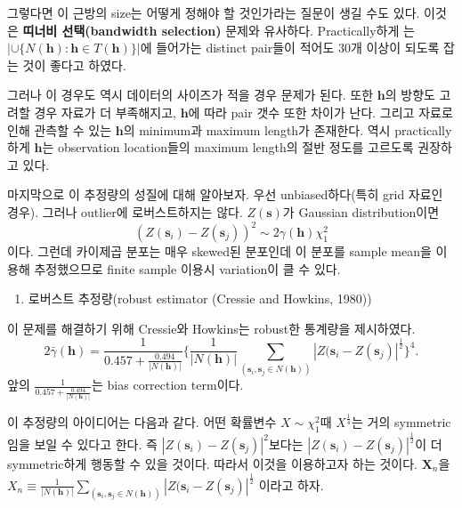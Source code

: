 \documentclass[b5paper,]{scrbook}
\providecommand{\tightlist}{%
  \setlength{\itemsep}{0pt}\setlength{\parskip}{0pt}}
\theoremstyle{plain}
\theoremstyle{definition}
\numberwithin{equation}{section}
\begin{document}
그렇다면 이 근방의 size는 어떻게 정해야 할 것인가라는 질문이 생길 수도 있다. 이것은 \textbf{띠너비 선택(bandwidth selection)} 문제와 유사하다. Practically하게 \citep{Journel2003}는 \(| \cup \{N(\mathbf{h}): \mathbf{h} \in T(\mathbf{h}) \} |\)에 들어가는 distinct pair들이 적어도 30개 이상이 되도록 잡는 것이 좋다고 하였다.

그러나 이 경우도 역시 데이터의 사이즈가 적을 경우 문제가 된다. 또한 \(\mathbf{h}\)의 방향도 고려할 경우 자료가 더 부족해지고, \(\mathbf{h}\)에 따라 pair 갯수 또한 차이가 난다. 그리고 자료로 인해 관측할 수 있는 \(\mathbf{h}\)의 minimum과 maximum length가 존재한다. 역시 practically하게 \(\mathbf{h}\)는 observation location들의 maximum length의 절반 정도를 고르도록 권장하고 있다.

마지막으로 이 추정량의 성질에 대해 알아보자. 우선 unbiased하다(특히 grid 자료인 경우). 그러나 outlier에 로버스트하지는 않다. \(Z(\mathbf{s})\)가 Gaussian distribution이면
\[(Z(\mathbf{s}_{i})-Z(\mathbf{s}_{j}))^{2} \sim 2 \gamma(\mathbf{h})\chi_{1}^{2}\]
이다. 그런데 카이제곱 분포는 매우 skewed된 분포인데 이 분포를 sample mean을 이용해 추정했으므로 finite sample 이용시 variation이 클 수 있다.

\begin{enumerate}
\def\labelenumi{\arabic{enumi}.}
\setcounter{enumi}{1}
\tightlist
\item
  로버스트 추정량(robust estimator (Cressie and Howkins, 1980))
\end{enumerate}

이 문제를 해결하기 위해 Cressie와 Howkins는 robust한 통계량을 제시하였다.
\[2 \bar{\gamma}(\mathbf{h})=\frac{1}{0.457+\frac{0.494}{|N(\mathbf{h})|}}\{\frac{1}{|N(\mathbf{h})|}\sum_{(\mathbf{s}_{i},\mathbf{s}_{j} \in N(\mathbf{h}))} |Z(\mathbf{s}_{i}-Z(\mathbf{s}_{j})|^{\frac{1}{2}}\}^{4}.\]
앞의 \(\frac{1}{0.457+\frac{0.494}{|N(\mathbf{h})|}}\)는 bias correction term이다.

이 추정량의 아이디어는 다음과 같다. 어떤 확률변수 \(X \sim \chi_{1}^{2}\)때 \(X^{\frac{1}{4}}\)는 거의 symmetric임을 보일 수 있다고 한다. 즉 \(|Z(\mathbf{s}_{i})-Z(\mathbf{s}_{j})|^{2}\)보다는 \(|Z(\mathbf{s}_{i})-Z(\mathbf{s}_{j})|^{\frac{1}{2}}\)이 더 symmetric하게 행동할 수 있을 것이다. 따라서 이것을 이용하고자 하는 것이다. \(\mathbf{X}_{n}\)을 \(X_{n}\equiv\frac{1}{|N(\mathbf{h})|}\sum_{(\mathbf{s}_{i},\mathbf{s}_{j} \in N(\mathbf{h}))} |Z(\mathbf{s}_{i}-Z(\mathbf{s}_{j})|^{\frac{1}{2}}\) 이라고 하자.
\end{document}
